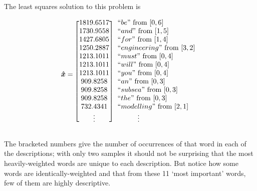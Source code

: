 \documentclass[12pt]{article}
\begin{document}
    The least squares solution to this problem is

    \begin{equation*}
        \bm{\hat{x}} = 
        \begin{blockarray}{[c] l}
            1819.6517 & ``be"           \text{ from } [0, 6] \\
            1730.9558 & ``and"          \text{ from } [1, 5] \\
            1427.6805 & ``for"          \text{ from } [1, 4] \\
            1250.2887 & ``engineering"  \text{ from } [3, 2] \\
            1213.1011 & ``must"         \text{ from } [0, 4] \\
            1213.1011 & ``will"         \text{ from } [0, 4] \\
            1213.1011 & ``you"          \text{ from } [0, 4] \\
            909.8258 & ``an"            \text{ from } [0, 3] \\
            909.8258 & ``subsea"        \text{ from } [0, 3] \\
            909.8258 & ``the"           \text{ from } [0, 3] \\
            732.4341 & ``modelling"     \text{ from } [2, 1] \\
            \vdots & \hspace{1cm}\vdots
        \end{blockarray}
    \end{equation*}

    The bracketed numbers give the number of occurrences of that word in each
    of the descriptions; with only two samples it should not be surprising that
    the most heavily-weighted words are unique to each description.  But notice
    how some words are identically-weighted and that from these 11 `most
    important' words, few of them are highly descriptive.
    
\end{document}
